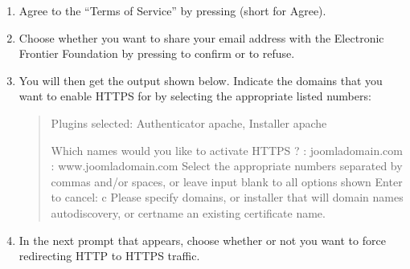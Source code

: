 \documentclass[a4paper,10pt,english,openany,oneside]{sphinxmanual}
\begin{document}
\begin{sloppypar}
\begin{enumerate}
\item {} 
\sphinxAtStartPar
Agree to the “Terms of Service” by pressing  (short for Agree).

\item {} 
\sphinxAtStartPar
Choose whether you want to share your email address with the Electronic Frontier Foundation by pressing  to confirm or  to refuse.

\item {} 
\sphinxAtStartPar
You will then get the output shown below. Indicate the domains that you want to enable HTTPS for by selecting the appropriate listed numbers:
\begin{quote}

\begin{sphinxVerbatim}[commandchars=\\\{\}]
Plugins selected: Authenticator apache, Installer apache

Which names would you like to activate HTTPS ?
\PYGZhy{} \PYGZhy{} \PYGZhy{} \PYGZhy{} \PYGZhy{} \PYGZhy{} \PYGZhy{} \PYGZhy{} \PYGZhy{} \PYGZhy{} \PYGZhy{} \PYGZhy{} \PYGZhy{} \PYGZhy{} \PYGZhy{} \PYGZhy{} \PYGZhy{} \PYGZhy{} \PYGZhy{} \PYGZhy{} \PYGZhy{} \PYGZhy{} \PYGZhy{} \PYGZhy{} \PYGZhy{} \PYGZhy{} \PYGZhy{} \PYGZhy{} \PYGZhy{} \PYGZhy{} \PYGZhy{} \PYGZhy{} \PYGZhy{} \PYGZhy{} \PYGZhy{} \PYGZhy{} \PYGZhy{} \PYGZhy{} \PYGZhy{} \PYGZhy{}
: joomla\PYGZhy{}domain.com
: www.joomla\PYGZhy{}domain.com
\PYGZhy{} \PYGZhy{} \PYGZhy{} \PYGZhy{} \PYGZhy{} \PYGZhy{} \PYGZhy{} \PYGZhy{} \PYGZhy{} \PYGZhy{} \PYGZhy{} \PYGZhy{} \PYGZhy{} \PYGZhy{} \PYGZhy{} \PYGZhy{} \PYGZhy{} \PYGZhy{} \PYGZhy{} \PYGZhy{} \PYGZhy{} \PYGZhy{} \PYGZhy{} \PYGZhy{} \PYGZhy{} \PYGZhy{} \PYGZhy{} \PYGZhy{} \PYGZhy{} \PYGZhy{} \PYGZhy{} \PYGZhy{} \PYGZhy{} \PYGZhy{} \PYGZhy{} \PYGZhy{} \PYGZhy{} \PYGZhy{} \PYGZhy{} \PYGZhy{}
Select the appropriate numbers separated by commas and/or spaces, or leave input
blank to  all options shown Enter  to cancel: c
Please specify \PYGZhy{}\PYGZhy{}domains, or \PYGZhy{}\PYGZhy{}installer that will   domain names autodiscovery, or \PYGZhy{}\PYGZhy{}cert\PYGZhy{}name  an existing certificate name.
\end{sphinxVerbatim}
\end{quote}

\item {} 
\sphinxAtStartPar
In the next prompt that appears, choose whether or not you want to force redirecting HTTP to HTTPS traffic.
\begin{quote}


\end{quote}
\end{enumerate}
\end{sloppypar}
\end{document}

